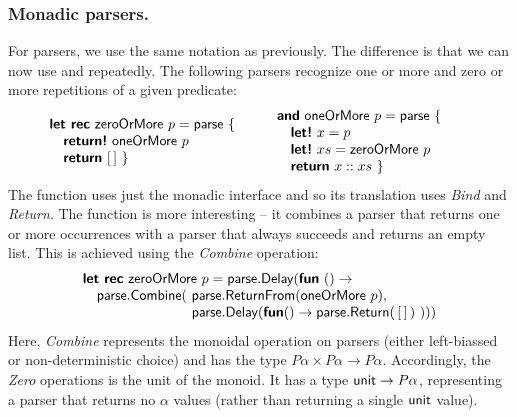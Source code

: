 \documentclass[runningheads,a4paper]{llncs}
\begin{document}
\subsubsection{Monadic parsers.} For parsers, we use the same notation as previously.
The difference is that we can now use  and  repeatedly. The 
following parsers recognize one or more and zero or more repetitions of a given predicate:
%
\begin{equation*}
\hspace{-2em} \begin{array}{l}
\kvd{let rec}~\ident{zeroOrMore}~p = \ident{parse}~\{\\
\quad \kvd{return!}~\ident{oneOrMore}~p\\
\quad \kvd{return}~[\,] ~\}
\end{array}
\qquad
\begin{array}{l}
\kvd{and}~\ident{oneOrMore}~p = \ident{parse}~\{\\
\quad \kvd{let!}~x=p\\
\quad \kvd{let!}~xs = \ident{zeroOrMore}~p\\
\quad \kvd{return}~x::xs ~\}
\end{array}
\end{equation*}
%
The  function uses just the monadic interface and so its translation uses 
\emph{Bind} and \emph{Return}. The  function is more interesting -- it combines
a parser that returns one or more occurrences with a parser that always succeeds and returns an empty 
list. This is achieved using the \emph{Combine} operation:
%
\begin{equation*}
\begin{array}{l}
\kvd{let rec}~\ident{zeroOrMore}~p = \ident{parse}.\ident{Delay}(\kvd{fun}~()\rightarrow \\
\quad \ident{parse}.\ident{Combine}(~\ident{parse}.\ident{ReturnFrom}(\ident{oneOrMore}~p), \\
\hspace{7.8em} \ident{parse}.\ident{Delay}(\kvd{fun} () \rightarrow \ident{parse}.\ident{Return}(\,[\,]\,)~)))
\end{array}
\end{equation*}
%
Here, \emph{Combine} represents the monoidal operation on parsers (either left-biassed or
non-deterministic choice) and has the type $P\alpha \times P\alpha \rightarrow P\alpha$. Accordingly,
the \emph{Zero} operations is the unit of the monoid. It has a type $\textnormal{\sffamily unit}\rightarrow P\alpha$,
representing a parser that returns no $\alpha$ values (rather than returning a single $\textnormal{\sffamily unit}$ value).
\end{document}
